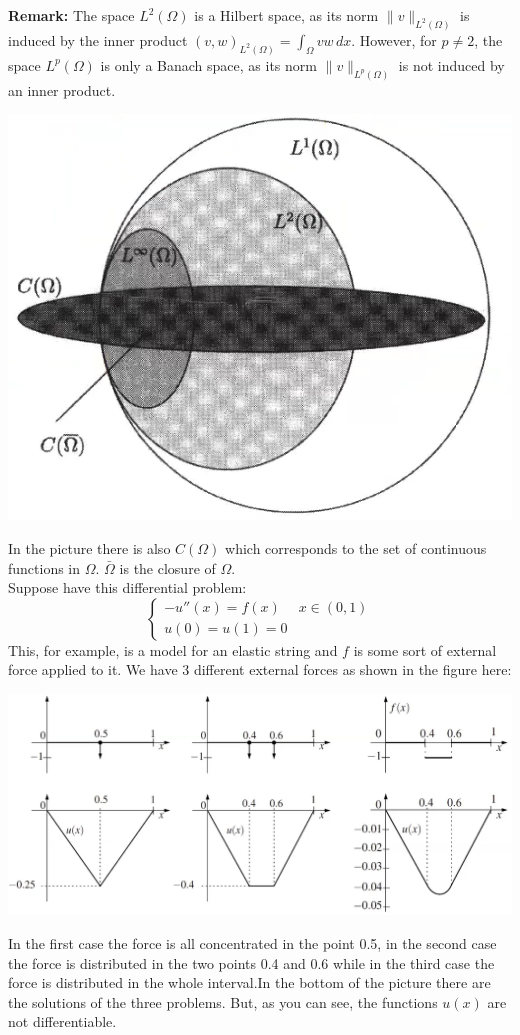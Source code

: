 \textbf{Remark:} The space $L^2(\Omega)$ is a Hilbert space, as its norm $\|v\|_{L^2(\Omega)}$ is induced by the inner product $(v,w)_{L^2(\Omega)} = \int_{\Omega} vw \, dx$. However, for $p \neq 2$, the space $L^p(\Omega)$ is only a Banach space, as its norm $\|v\|_{L^p(\Omega)}$ is not induced by an inner product.
\begin{center}
    \includegraphics[scale = 0.35]{../images/LpSpaces.png}
\end{center}
In the picture there is also $C(\Omega)$ which corresponds to the set of continuous functions in $\Omega$. $\bar{\Omega}$ is the closure of $\Omega$.\\

Suppose have this differential problem:
\[
    \begin{cases}
        -u''(x) = f(x) & x \in (0,1)\\  
        u(0) = u(1) = 0
    \end{cases}    
\]
This, for example, is a model for an elastic string and $f$ is some sort of external force applied to it. We have 3 different external forces as shown in the figure here:
\begin{center}
    \includegraphics[scale = 0.35]{../images/ExternalForces.png}    
\end{center}
In the first case the force is all concentrated in the point 0.5, in the second case the force is distributed in the two points 0.4 and 0.6 while in the third case the force is distributed in the whole interval.In the bottom of the picture there are the solutions of the three problems. But, as you can see, the functions $u(x)$ are not differentiable.

